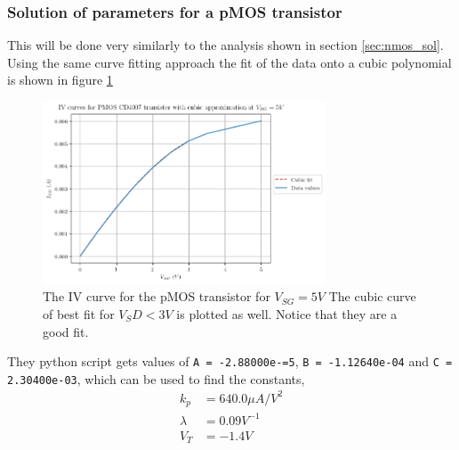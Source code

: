 \documentclass[titlepage, 12pt]{article}
\begin{document}
    \subsubsection{Solution of parameters for a pMOS transistor}
    This will be done very similarly to the analysis shown in section
    \ref{sec:nmos_sol}. Using the same curve fitting approach the fit of
    the data onto a cubic polynomial is shown in figure
    \ref{fig:part_1b_cube}
    \begin{figure}[H]
        \centering
        \includegraphics[width=0.75\textwidth]{figures/part_1_pcube.png}
        \caption{The IV curve for the pMOS transistor for $V_{SG} = 5V$
        The cubic curve of best fit for $V_SD < 3V$ is plotted as well.
        Notice that they are a good fit.}
        \label{fig:part_1b_cube}
    \end{figure}
    They python script gets values of \texttt{A = -2.88000e-=5},
    \texttt{B = -1.12640e-04} and \texttt{C = 2.30400e-03}, which can be
    used to find the constants,
    \begin{align*}
        k_p &= 640.0\mu A/V^2\\
        \lambda &= 0.09 V^{-1}\\
        V_T &= -1.4 V
    \end{align*}
\end{document}
